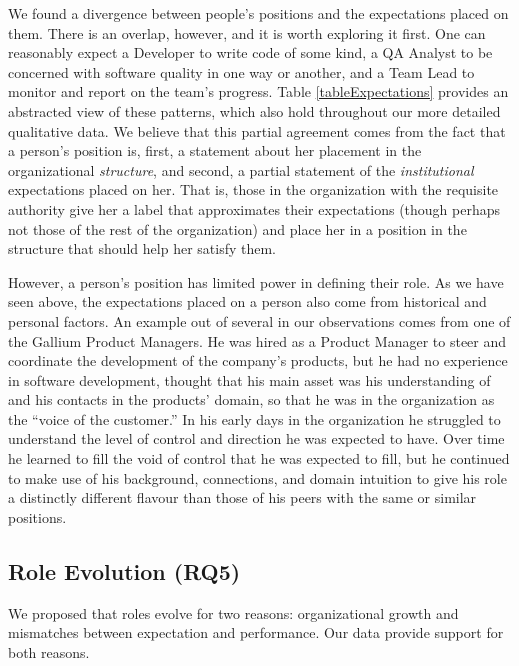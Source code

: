 \documentclass[10pt, conference, compsocconf]{IEEEtran}
\begin{document}
We found a divergence between people's positions and the expectations placed on them. There is an overlap, however, and it is worth exploring it first. One can reasonably expect a Developer to write code of some kind, a QA Analyst to be concerned with software quality in one way or another, and a Team Lead to monitor and report on the team's progress. Table \ref{tableExpectations} provides an abstracted view of these patterns, which also hold throughout our more detailed qualitative data. We believe that this partial agreement comes from the fact that a person's position is, first, a statement about her placement in the organizational \emph{structure}, and second, a partial statement of the \emph{institutional} expectations placed on her. That is, those in the organization with the requisite authority give her a label that approximates their expectations (though perhaps not those of the rest of the organization) and place her in a position in the structure that should help her satisfy them.

However, a person's position has limited power in defining their role. As we have seen above, the expectations placed on a person also come from historical and personal factors. An example out of several in our observations comes from one of the Gallium Product Managers. He was hired as a Product Manager to steer and coordinate the development of the company's products, but he had no experience in software development, thought that his main asset was his understanding of and his contacts in the products' domain, so that he was in the organization as the ``voice of the customer.'' In his early days in the organization he struggled to understand the level of control and direction he was expected to have. Over time he learned to fill the void of control that he was expected to fill, but he continued to make use of his background, connections, and domain intuition to give his role a distinctly different flavour than those of his peers with the same or similar positions.


\subsection{Role Evolution (RQ5)}

We proposed that roles evolve for two reasons: organizational growth and mismatches between expectation and performance. Our data provide support for both reasons.
\end{document}
